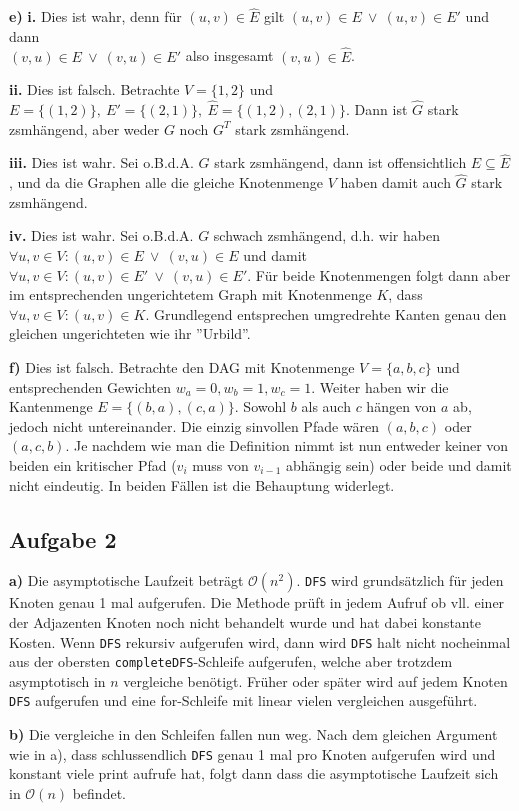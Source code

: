 \documentclass[a4paper,graphics,11pt]{article}
\newcommand{\aufgabe}[1]{\subsection*{Aufgabe #1}}
\begin{document}
\textbf{e)}
\textbf{i.}
Dies ist wahr, denn für $(u,v) \in \hat{E}$ gilt $(u,v) \in E\ \lor\ (u,v) \in E'$ und dann\\
$(v,u) \in E\ \lor\ (v,u) \in E'$ also insgesamt $(v,u) \in \hat{E}$.

\textbf{ii.}
Dies ist falsch. Betrachte $V = \{1,2\}$ und $E = \{(1,2)\},\ E' = \{(2,1)\},\ \hat{E} = \{(1,2),(2,1)\}$.
Dann ist $\hat{G}$ stark zsmhängend, aber weder $G$ noch $G^T$ stark zsmhängend.

\textbf{iii.}
Dies ist wahr. Sei o.B.d.A. $G$ stark zsmhängend, dann ist offensichtlich $E \subseteq \hat{E}$, und da
die Graphen alle die gleiche Knotenmenge $V$ haben damit auch $\hat{G}$ stark zsmhängend.

\textbf{iv.}
Dies ist wahr. Sei o.B.d.A. $G$ schwach zsmhängend, d.h. wir haben\\
$\forall u,v \in V: (u,v) \in E\ \lor\ (v,u) \in E$ und damit $\forall u,v \in V: (u,v) \in E'\ \lor\ (v,u) \in E'$. Für beide Knotenmengen
folgt dann aber im entsprechenden ungerichtetem Graph mit Knotenmenge $K$, dass
$\forall u,v \in V: (u,v) \in K$. Grundlegend entsprechen umgredrehte Kanten genau den gleichen ungerichteten wie
ihr ''Urbild''.

\newpage

\textbf{f)}
Dies ist falsch. Betrachte den DAG mit Knotenmenge $V = \{a,b,c\}$ und entsprechenden Gewichten $w_a = 0, w_b = 1,
w_c = 1$.
Weiter haben wir die Kantenmenge $E = \{(b,a),(c,a)\}$. Sowohl $b$ als auch $c$ hängen von $a$ ab, jedoch
nicht untereinander. Die einzig sinvollen Pfade wären $(a,b,c)$ oder $(a,c,b)$. Je nachdem
wie man die Definition nimmt ist nun entweder keiner von beiden ein kritischer Pfad ($v_i$ muss von $v_{i-1}$ abhängig
sein) oder beide und damit nicht eindeutig. In beiden Fällen ist die Behauptung widerlegt.

\aufgabe{2}
\textbf{a)}
Die asymptotische Laufzeit beträgt $\mathcal{O}(n^2)$. \texttt{DFS} wird grundsätzlich für jeden Knoten
genau 1 mal aufgerufen. Die Methode prüft in jedem Aufruf ob vll. einer der Adjazenten Knoten noch nicht behandelt
wurde und hat dabei konstante Kosten. Wenn \texttt{DFS} rekursiv aufgerufen wird, dann wird \texttt{DFS} halt
nicht nocheinmal aus der obersten \texttt{completeDFS}-Schleife aufgerufen, welche aber trotzdem asymptotisch
in $n$ vergleiche benötigt. Früher oder später wird auf jedem Knoten \texttt{DFS} aufgerufen und eine
for-Schleife mit linear vielen vergleichen ausgeführt.

\textbf{b)}
Die vergleiche in den Schleifen fallen nun weg. Nach dem gleichen Argument wie in a), dass schlussendlich
\texttt{DFS} genau 1 mal pro Knoten aufgerufen wird und konstant viele print aufrufe hat, folgt dann
dass die asymptotische Laufzeit sich in $\mathcal{O}(n)$ befindet.
\end{document}
